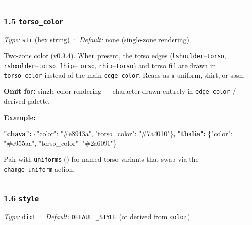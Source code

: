 \documentclass[
  11pt,
]{book}
\newenvironment{Shaded}{}{}
\newcommand{\DataTypeTok}[1]{\textcolor[rgb]{0.56,0.13,0.00}{#1}}
\newcommand{\ErrorTok}[1]{\textcolor[rgb]{1.00,0.00,0.00}{\textbf{#1}}}
\newcommand{\FunctionTok}[1]{\textcolor[rgb]{0.02,0.16,0.49}{#1}}
\newcommand{\StringTok}[1]{\textcolor[rgb]{0.25,0.44,0.63}{#1}}
\begin{document}
\begin{center}\rule{0.5\linewidth}{0.5pt}\end{center}

\subsubsection{\texorpdfstring{1.5
\texttt{torso\_color}}{1.5 torso\_color}}\label{torso_color}

\emph{Type:} \texttt{str} (hex string) · \emph{Default:} none
(single-zone rendering)

Two-zone color (v0.9.4). When present, the torso edges
(\texttt{lshoulder}--\texttt{torso}, \texttt{rshoulder}--\texttt{torso},
\texttt{lhip}--\texttt{torso}, \texttt{rhip}--\texttt{torso}) and torso
fill are drawn in \texttt{torso\_color} instead of the main
\texttt{edge\_color}. Reads as a uniform, shirt, or sash.

\textbf{Omit for:} single-color rendering --- character drawn entirely
in \texttt{edge\_color} / derived palette.

\textbf{Example:}

\begin{Shaded}
\begin{Highlighting}[]
\ErrorTok{"chava":}  \FunctionTok{\{}\DataTypeTok{"color"}\FunctionTok{:} \StringTok{"\#e8943a"}\FunctionTok{,} \DataTypeTok{"torso\_color"}\FunctionTok{:} \StringTok{"\#7a4010"}\FunctionTok{\}}\ErrorTok{,}
\ErrorTok{"thalia":} \FunctionTok{\{}\DataTypeTok{"color"}\FunctionTok{:} \StringTok{"\#e055aa"}\FunctionTok{,} \DataTypeTok{"torso\_color"}\FunctionTok{:} \StringTok{"\#2a6090"}\FunctionTok{\}}
\end{Highlighting}
\end{Shaded}

Pair with \texttt{uniforms} (\cite{uniforms}) for named
torso variants that swap via the \texttt{change\_uniform} action.

\begin{center}\rule{0.5\linewidth}{0.5pt}\end{center}

\subsubsection{\texorpdfstring{1.6
\texttt{style}}{1.6 style}}\label{style}

\emph{Type:} \texttt{dict} · \emph{Default:} \texttt{DEFAULT\_STYLE} (or
derived from \texttt{color})
\end{document}
